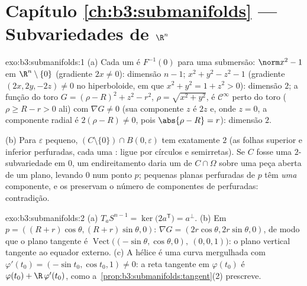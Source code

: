 \section*{Capítulo \ref{ch:b3:submanifolds} --- Subvariedades de
$\R^n$}

\begin{solution}{exo:b3:submanifolds:1}
(a) Cada um é $F^{-1}(0)$ para uma submersão: $\norm x^2 - 1$ em
$\R^n\setminus\{0\}$ (gradiente $2x \neq 0$): dimensão $n-1$;
$x^2 + y^2 - z^2 - 1$ (gradiente $(2x, 2y, -2z) \neq 0$ no
hiperboloide, em que $x^2 + y^2 = 1 + z^2 > 0$): dimensão $2$;
a função do toro $G = (\rho - R)^2 + z^2 - r^2$, $\rho =
\sqrt{x^2+y^2}$, é $\mathcal C^\infty$ perto do toro ($\rho
\geq R - r > 0$ ali) com $\nabla G \neq 0$ (sua
componente $z$ é $2z$ e, onde $z = 0$, a componente radial
é $2(\rho - R)\ne0$, pois $\abs{\rho - R} = r$): dimensão
$2$.

(b) Para $\varepsilon$ pequeno,
$(C\setminus\{0\})\cap B(0,\varepsilon)$ tem exatamente $2$
 (as folhas superior e inferior perfuradas, cada uma
: ligue por círculos e semirretas). Se $C$
fosse uma $2$-subvariedade em $0$, um endireitamento daria um
 de $C\cap\Omega$ sobre uma peça aberta de um
plano, levando $0$ num ponto $p$; pequenas  planas
perfuradas de $p$ têm \emph{uma} componente, e os
 preservam o número de componentes de 
perfuradas: contradição.
\end{solution}

\begin{solution}{exo:b3:submanifolds:2}
(a) $T_aS^{n-1} = \ker\bigl(2a^{\mathsf T}\bigr) = a^\perp$.
(b) Em $p = ((R+r)\cos\theta, (R+r)\sin\theta, 0)$: $\nabla G
= (2r\cos\theta, 2r\sin\theta, 0)$, de modo que o plano tangente é
$\operatorname{Vect}\bigl((-\sin\theta, \cos\theta, 0),\ (0,
0, 1)\bigr)$: o plano vertical tangente ao equador
externo.
(c) A hélice é uma curva mergulhada com $\varphi'(t_0) =
(-\sin t_0, \cos t_0, 1) \neq 0$: a reta tangente em
$\varphi(t_0)$ é $\varphi(t_0) + \R\,\varphi'(t_0)$, como
a~\cref{prop:b3:submanifolds:tangent}(2) prescreve.
\end{solution}


